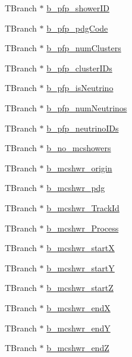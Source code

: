 \begin{DoxyCompactItemize}
T\-Branch $\ast$ \hyperlink{classanatree_a391ae38fcda06b0ecda453169da666d8}{b\-\_\-pfp\-\_\-shower\-I\-D}
\item 
T\-Branch $\ast$ \hyperlink{classanatree_af91df6f47b01f670143259247dfd9e72}{b\-\_\-pfp\-\_\-pdg\-Code}
\item 
T\-Branch $\ast$ \hyperlink{classanatree_a49934506a08737111826ce208573969a}{b\-\_\-pfp\-\_\-num\-Clusters}
\item 
T\-Branch $\ast$ \hyperlink{classanatree_ae3798617360ef810c3ea6a2ab02ceeec}{b\-\_\-pfp\-\_\-cluster\-I\-Ds}
\item 
T\-Branch $\ast$ \hyperlink{classanatree_a7fc996df14b3c81e085bb1e986a03f06}{b\-\_\-pfp\-\_\-is\-Neutrino}
\item 
T\-Branch $\ast$ \hyperlink{classanatree_a5f21e392e8debeb636dbc0df099de7d0}{b\-\_\-pfp\-\_\-num\-Neutrinos}
\item 
T\-Branch $\ast$ \hyperlink{classanatree_abcb3e7aa1f5ad179314b3d15f58827ec}{b\-\_\-pfp\-\_\-neutrino\-I\-Ds}
\item 
T\-Branch $\ast$ \hyperlink{classanatree_ad446412d63d834a7d48a3041d1f8f2b7}{b\-\_\-no\-\_\-mcshowers}
\item 
T\-Branch $\ast$ \hyperlink{classanatree_ad8c0ae84236881be75952b86b28e50f9}{b\-\_\-mcshwr\-\_\-origin}
\item 
T\-Branch $\ast$ \hyperlink{classanatree_ad1a779beb5082c920ee1cd680a6cfe9b}{b\-\_\-mcshwr\-\_\-pdg}
\item 
T\-Branch $\ast$ \hyperlink{classanatree_a2d47765807edcdd51399e7f2b7fce0ff}{b\-\_\-mcshwr\-\_\-\-Track\-Id}
\item 
T\-Branch $\ast$ \hyperlink{classanatree_a21a80d239c6c7c1c615b4e2407428720}{b\-\_\-mcshwr\-\_\-\-Process}
\item 
T\-Branch $\ast$ \hyperlink{classanatree_a7ef7958b16e3383fa03795e4e16b9363}{b\-\_\-mcshwr\-\_\-start\-X}
\item 
T\-Branch $\ast$ \hyperlink{classanatree_acc1677d9637b7b0aa644e6a6b0a54f4f}{b\-\_\-mcshwr\-\_\-start\-Y}
\item 
T\-Branch $\ast$ \hyperlink{classanatree_a82cc353273ebfa80e40bba2798d1dbb3}{b\-\_\-mcshwr\-\_\-start\-Z}
\item 
T\-Branch $\ast$ \hyperlink{classanatree_a861277cff62a8cb363ad8016301197b0}{b\-\_\-mcshwr\-\_\-end\-X}
\item 
T\-Branch $\ast$ \hyperlink{classanatree_a1ff19bbcff994abb11b6a066154a4a43}{b\-\_\-mcshwr\-\_\-end\-Y}
\item 
T\-Branch $\ast$ \hyperlink{classanatree_a134bd4c0b3550948069ac1b14772b5ba}{b\-\_\-mcshwr\-\_\-end\-Z}

\end{DoxyCompactItemize}
